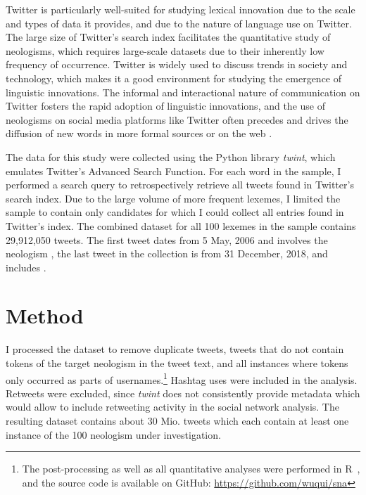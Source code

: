 \documentclass[
  a4paper,
  abstract=on,
  captions=tableabove
  ]{scrartcl}
\begin{document}
    Twitter is particularly well-suited for studying lexical innovation due to the scale and types of data it provides, and due to the nature of language use on Twitter. The large size of Twitter's search index facilitates the quantitative study of neologisms, which requires large-scale datasets due to their inherently low frequency of occurrence. Twitter is widely used to discuss trends in society and technology, which makes it a good environment for studying the emergence of linguistic innovations. The informal and interactional nature of communication on Twitter fosters the rapid adoption of linguistic innovations, and the use of neologisms on social media platforms like Twitter often precedes and drives the diffusion of new words in more formal sources or on the web \parencite{Wurschinger2016UsingWeb}.


    The data for this study were collected using the Python library \emph{twint}, which emulates Twitter's Advanced Search Function. For each word in the sample, I performed a search query to retrospectively retrieve all tweets found in Twitter's search index. Due to the large volume of more frequent lexemes, I limited the sample to contain only candidates for which I could collect all entries found in Twitter's index. The combined dataset for all 100 lexemes in the sample contains 29,912,050 tweets. The first tweet dates from 5 May, 2006 and involves the neologism , the last tweet in the collection is from 31 December, 2018, and includes .

\section{Method}
  \label{sec:method}

  I processed the dataset to remove duplicate tweets, tweets that do not contain tokens of the target neologism in the tweet text, and all instances where tokens only occurred as parts of usernames.\footnote{The post-processing as well as all quantitative analyses were performed in R~\parencite{RCoreTeam2018LanguageEnvironment}, and the source code is available on GitHub: \url{https://github.com/wuqui/sna}} Hashtag uses were included in the analysis. Retweets were excluded, since \emph{twint} does not consistently provide metadata which would allow to include retweeting activity in the social network analysis. The resulting dataset contains about 30 Mio. tweets which each contain at least one instance of the 100 neologism under investigation.
\end{document}

